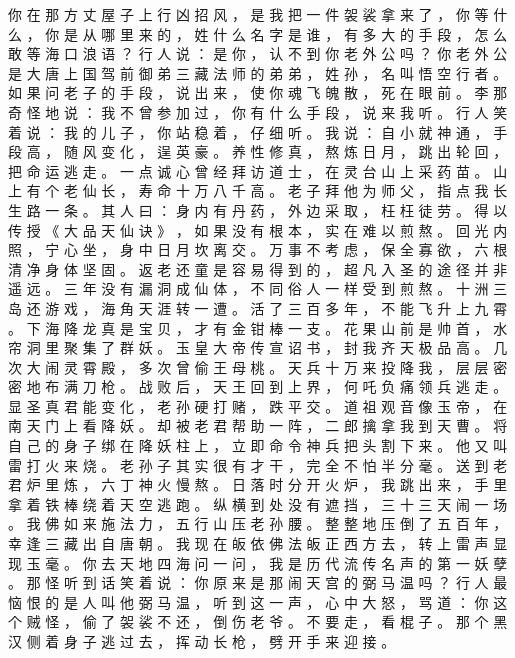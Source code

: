 {你 在 那 方 丈 屋 子 上 行 凶 招 风 ， 是 我 把 一 件 袈 裟 拿 来 了 ， 你 等 什 么 ， 你 是 从 哪 里 来 的 ， 姓 什 么 名 字 是 谁 ， 有 多 大 的 手 段 ， 怎 么 敢 等 海 口 浪 语 ？
行 人 说 ： 是 你 ， 认 不 到 你 老 外 公 吗 ？
你 老 外 公 是 大 唐 上 国 驾 前 御 弟 三 藏 法 师 的 弟 弟 ， 姓 孙 ， 名 叫 悟 空 行 者 。
如 果 问 老 子 的 手 段 ， 说 出 来 ， 使 你 魂 飞 魄 散 ， 死 在 眼 前 。
李 那 奇 怪 地 说 ： 我 不 曾 参 加 过 ， 你 有 什 么 手 段 ， 说 来 我 听 。
行 人 笑 着 说 ： 我 的 儿 子 ， 你 站 稳 着 ， 仔 细 听 。
我 说 ： 自 小 就 神 通 ， 手 段 高 ， 随 风 变 化 ， 逞 英 豪 。
养 性 修 真 ， 熬 炼 日 月 ， 跳 出 轮 回 ， 把 命 运 逃 走 。
一 点 诚 心 曾 经 拜 访 道 士 ， 在 灵 台 山 上 采 药 苗 。
山 上 有 个 老 仙 长 ， 寿 命 十 万 八 千 高 。
老 子 拜 他 为 师 父 ， 指 点 我 长 生 路 一 条 。
其 人 曰 ： 身 内 有 丹 药 ， 外 边 采 取 ， 枉 枉 徒 劳 。
得 以 传 授 《 大 品 天 仙 诀 》 ， 如 果 没 有 根 本 ， 实 在 难 以 煎 熬 。
回 光 内 照 ， 宁 心 坐 ， 身 中 日 月 坎 离 交 。
万 事 不 考 虑 ， 保 全 寡 欲 ， 六 根 清 净 身 体 坚 固 。
返 老 还 童 是 容 易 得 到 的 ， 超 凡 入 圣 的 途 径 并 非 遥 远 。
三 年 没 有 漏 洞 成 仙 体 ， 不 同 俗 人 一 样 受 到 煎 熬 。
十 洲 三 岛 还 游 戏 ， 海 角 天 涯 转 一 遭 。
活 了 三 百 多 年 ， 不 能 飞 升 上 九 霄 。
下 海 降 龙 真 是 宝 贝 ， 才 有 金 钳 棒 一 支 。
花 果 山 前 是 帅 首 ， 水 帘 洞 里 聚 集 了 群 妖 。
玉 皇 大 帝 传 宣 诏 书 ， 封 我 齐 天 极 品 高 。
几 次 大 闹 灵 霄 殿 ， 多 次 曾 偷 王 母 桃 。
天 兵 十 万 来 投 降 我 ， 层 层 密 密 地 布 满 刀 枪 。
战 败 后 ， 天 王 回 到 上 界 ， 何 吒 负 痛 领 兵 逃 走 。
显 圣 真 君 能 变 化 ， 老 孙 硬 打 赌 ， 跌 平 交 。
道 祖 观 音 像 玉 帝 ， 在 南 天 门 上 看 降 妖 。
却 被 老 君 帮 助 一 阵 ， 二 郎 擒 拿 我 到 天 曹 。
将 自 己 的 身 子 绑 在 降 妖 柱 上 ， 立 即 命 令 神 兵 把 头 割 下 来 。
他 又 叫 雷 打 火 来 烧 。
老 孙 子 其 实 很 有 才 干 ， 完 全 不 怕 半 分 毫 。
送 到 老 君 炉 里 炼 ， 六 丁 神 火 慢 熬 。
日 落 时 分 开 火 炉 ， 我 跳 出 来 ， 手 里 拿 着 铁 棒 绕 着 天 空 逃 跑 。
纵 横 到 处 没 有 遮 挡 ， 三 十 三 天 闹 一 场 。
我 佛 如 来 施 法 力 ， 五 行 山 压 老 孙 腰 。
整 整 地 压 倒 了 五 百 年 ， 幸 逢 三 藏 出 自 唐 朝 。
我 现 在 皈 依 佛 法 皈 正 西 方 去 ， 转 上 雷 声 显 现 玉 毫 。
你 去 天 地 四 海 问 一 问 ， 我 是 历 代 流 传 名 声 的 第 一 妖 孽 。
那 怪 听 到 话 笑 着 说 ： 你 原 来 是 那 闹 天 宫 的 弼 马 温 吗 ？ 行 人 最 恼 恨 的 是 人 叫 他 弼 马 温 ， 听 到 这 一 声 ， 心 中 大 怒 ， 骂 道 ： 你 这 个 贼 怪 ， 偷 了 袈 裟 不 还 ， 倒 伤 老 爷 。
不 要 走 ， 看 棍 子 。
那 个 黑 汉 侧 着 身 子 逃 过 去 ， 挥 动 长 枪 ， 劈 开 手 来 迎 接 。
}
